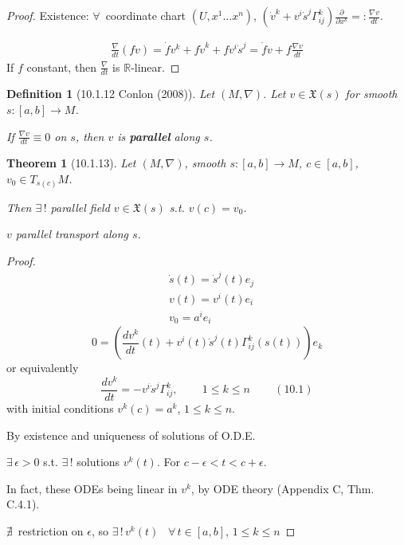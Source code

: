 \documentclass[10pt]{amsart}
\newtheorem{theorem}{Theorem}
\newtheorem{definition}{Definition}
\begin{document}
\begin{multicols*}{2}
\begin{proof}
	Existence: $\forall \, $ coordinate chart $(U,x^1\dots x^n)$, $\left( \dot{v}^k + v^i \dot{s}^j \Gamma_{ij}^k \right) \frac{ \partial }{ \partial x^k } =: \frac{ \nabla v}{dt}$.  
	
	\[
	\begin{gathered}
	\frac{\nabla}{dt}(fv) = \dot{f}v^k + f\dot{v}^k + fv^i \dot{s}^j = \dot{f}v + f\frac{ \nabla v}{dt}
	\end{gathered}
	\]
If $f$ constant, then $\frac{\nabla}{dt}$ is $\mathbb{R}$-linear.  	

\end{proof}

\begin{definition}[10.1.12 Conlon (2008)\cite{Conl2008}]
	Let $(M,\nabla)$.  Let $v\in\mathfrak{X}(s)$ for smooth $s:[a,b] \to M$.  

If $\frac{\nabla v}{dt} \equiv 0$ on $s$, then $v$ is \textbf{parallel } along $s$.  
\end{definition}

\begin{theorem}[10.1.13] 
Let $(M,\nabla)$, smooth $s:[a,b]\to M$, $c\in [a,b]$, $v_0 \in T_{s(c)}M$.  

Then $\exists \, !$ parallel field $v\in \mathfrak{X}(s)$ s.t. $v(c) = v_0$.  

$v$ parallel transport along $s$.  
\end{theorem}
\begin{proof}
	\[
\begin{aligned}
	& \dot{s}(t) = \dot{s}^j(t) e_j \\ 
	&  v(t) = v^i(t) e_i  \\
& v_0 = a^i e_i
\end{aligned}
\]
\[
0 = \left( \frac{dv^k}{dt}(t) + v^i(t) \dot{s}^j(t) \Gamma^k_{ij}(s(t)) \right) e_k
\]
or equivalently
\begin{equation}
	\frac{dv^k}{dt} = - v^i \dot{s}^j \Gamma^k_{ij} , \qquad \, 1\leq k \leq n \qquad \, (10.1)
\end{equation}
with initial conditions $v^k(c) = a^k$, $1\leq k \leq n$.  

By existence and uniqueness of solutions of O.D.E.  

$\exists \, \epsilon > 0$ s.t. $\exists \, !$ solutions $v^k(t)$.  For $c-\epsilon < t < c+\epsilon$.  

In fact, these ODEs being linear in $v^k$,  by ODE theory (Appendix C, Thm. C.4.1).  

$\nexists \, $ restriction on $\epsilon$, so $\exists \, ! \, v^k(t)$ \, $\forall \, t \in [a,b]$, $1\leq k \leq n$  


\end{proof}
\end{multicols*}
\end{document}
